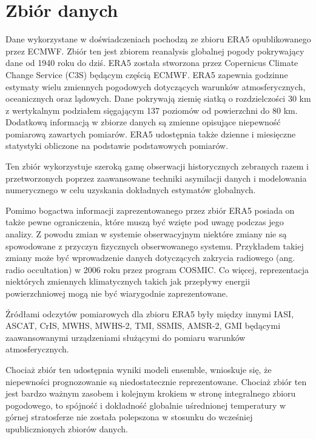 \section{Zbiór danych}

Dane wykorzystane w doświadczeniach pochodzą ze zbioru ERA5 opublikowanego przez ECMWF.
Zbiór ten jest zbiorem reanalysis globalnej pogody pokrywający dane od 1940 roku do dziś.
ERA5 została stworzona przez Copernicus Climate Change Service (C3S) będącym częścią ECMWF.
ERA5 zapewnia godzinne estymaty wielu zmiennych pogodowych dotyczących warunków atmosferycznych,
oceanicznych oraz lądowych. Dane pokrywają ziemię siatką o rozdzielczości 30 km z wertykalnym podziałem
sięgającym 137 poziomów od powierzchni do 80 km. Dodatkową informacją w zbiorze danych są zmienne
opisujące niepewność pomiarową zawartych pomiarów. ERA5 udostępnia także dzienne i miesięczne 
statystyki obliczone na podstawie podstawowych pomiarów.

Ten zbiór wykorzystuje szeroką gamę obserwacji historycznych zebranych razem i przetworzonych
poprzez zaawansowane techniki asymilacji danych i modelowania numerycznego w celu uzyskania 
dokładnych estymatów globalnych.

Pomimo bogactwa informacji zaprezentowanego przez zbiór ERA5 posiada on także pewne 
ograniczenia, które muszą być wzięte pod uwagę podczas jego analizy. Z powodu zmian w systemie
obserwacyjnym niektóre zmiany nie są spowodowane z przyczyn fizycznych obserwowanego systemu.
Przykładem takiej zmiany może być wprowadzenie danych dotyczących zakrycia radiowego (ang.
radio occultation) w 2006 roku przez program COSMIC.
Co więcej, reprezentacja niektórych zmiennych klimatycznych takich jak przepływy energii
powierzchniowej mogą nie być wiarygodnie zaprezentowane.

Źródłami odczytów pomiarowych dla zbioru ERA5 były między innymi IASI, 
ASCAT, CrIS, MWHS, MWHS-2, TMI, SSMIS, AMSR-2, GMI będącymi zaawansowanymi urządzeniami
służącymi do pomiaru warunków atmosferycznych.

Chociaż zbiór ten udostępnia wyniki modeli ensemble, wnioskuje się, że niepewności 
prognozowanie są niedostatecznie  reprezentowane. Chociaż zbiór ten jest bardzo ważnym 
zasobem i kolejnym krokiem w stronę integralnego zbioru pogodowego, to spójność i 
dokładność globalnie uśrednionej temperatury w górnej stratosferze nie została polepszona
w stosunku do wcześniej upublicznionych zbiorów danych.

